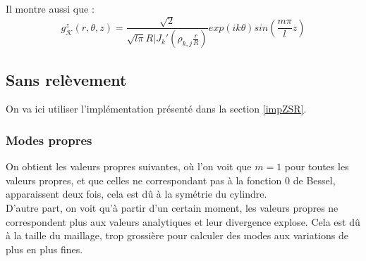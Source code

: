 Il montre aussi que :
\[
g_\mathcal{K}^z(r,\theta,z) = \frac{\sqrt{2}}{\sqrt{l\pi}R|J_k'\left(\rho_{k,j}\frac{r}{R}\right)}exp(ik\theta)sin\left(\frac{m\pi}{l}z\right)
\]

\subsection{Sans relèvement}
\label{resZSR}

On va ici utiliser l'implémentation présenté dans la section \ref{impZSR}.

\subsubsection{Modes propres}
On obtient les valeurs propres suivantes, où l'on voit que $m=1$ pour toutes les valeurs propres, et que celles ne correspondant pas à la fonction 0 de Bessel, apparaissent deux fois, cela est dû à la symétrie du cylindre.\\
D'autre part, on voit qu'à partir d'un certain moment, les valeurs propres ne correspondent plus aux valeurs analytiques et leur divergence explose. Cela est dû à la taille du maillage, trop grossière pour calculer des modes aux variations de plus en plus fines.\\
